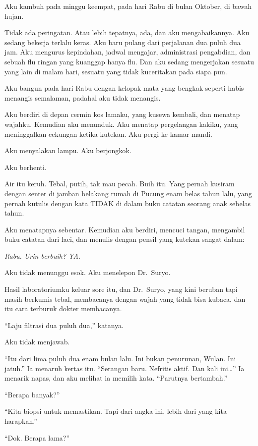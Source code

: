 \documentclass[11pt,twoside,openany]{book}
\makeatletter
\newcommand{\scenebreak}{\par\vspace{0.9em}{\centering\textsc{*\hspace{0.7em}*\hspace{0.7em}*}\par}\vspace{0.9em}\@afterindentfalse\@afterheading}
\makeatother
\begin{document}
\scenebreak
Aku kambuh pada minggu keempat, pada hari Rabu di bulan Oktober, di bawah hujan.

Tidak ada peringatan. Atau lebih tepatnya, ada, dan aku mengabaikannya. Aku sedang bekerja terlalu keras. Aku baru pulang dari perjalanan dua puluh dua jam. Aku mengurus kepindahan, jadwal mengajar, administrasi pengabdian, dan sebuah flu ringan yang kuanggap hanya flu. Dan aku sedang mengerjakan sesuatu yang lain di malam hari, sesuatu yang tidak kuceritakan pada siapa pun.

Aku bangun pada hari Rabu dengan kelopak mata yang bengkak seperti habis menangis semalaman, padahal aku tidak menangis.

Aku berdiri di depan cermin kos lamaku, yang kusewa kembali, dan menatap wajahku. Kemudian aku menunduk. Aku menatap pergelangan kakiku, yang meninggalkan cekungan ketika kutekan. Aku pergi ke kamar mandi.

Aku menyalakan lampu. Aku berjongkok.

Aku berhenti.

Air itu keruh. Tebal, putih, tak mau pecah. Buih itu. Yang pernah kusiram dengan senter di jamban belakang rumah di Pucung enam belas tahun lalu, yang pernah kutulis dengan kata TIDAK di dalam buku catatan seorang anak sebelas tahun.

Aku menatapnya sebentar. Kemudian aku berdiri, mencuci tangan, mengambil buku catatan dari laci, dan menulis dengan pensil yang kutekan sangat dalam:

\emph{Rabu. Urin berbuih? YA.}

Aku tidak menunggu esok. Aku menelepon Dr.~Suryo.

\scenebreak
Hasil laboratoriumku keluar sore itu, dan Dr.~Suryo, yang kini beruban tapi masih berkumis tebal, membacanya dengan wajah yang tidak bisa kubaca, dan itu cara terburuk dokter membacanya.

``Laju filtrasi dua puluh dua,'' katanya.

Aku tidak menjawab.

``Itu dari lima puluh dua enam bulan lalu. Ini bukan penurunan, Wulan. Ini jatuh.'' Ia menaruh kertas itu. ``Serangan baru. Nefritis aktif. Dan kali ini\ldots{}'' Ia menarik napas, dan aku melihat ia memilih kata. ``Parutnya bertambah.''

``Berapa banyak?''

``Kita biopsi untuk memastikan. Tapi dari angka ini, lebih dari yang kita harapkan.''

``Dok. Berapa lama?''
\end{document}
